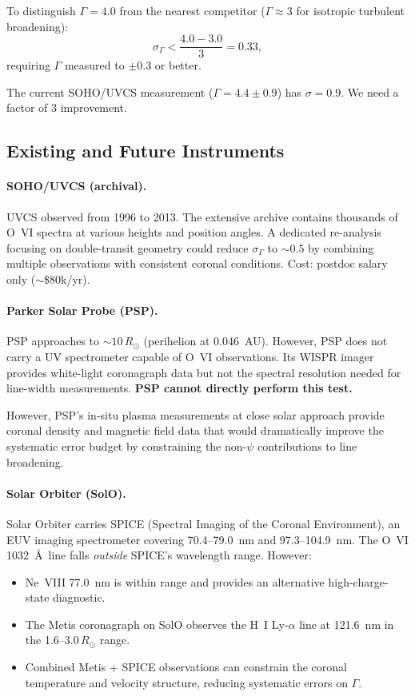 \documentclass[11pt]{article}
\newcommand{\Rsun}{R_\odot}
\begin{document}
To distinguish $\Gamma = 4.0$ from the nearest competitor
($\Gamma \approx 3$ for isotropic turbulent broadening):
\begin{equation}
\sigma_\Gamma < \frac{4.0 - 3.0}{3} = 0.33,
\end{equation}
requiring $\Gamma$ measured to $\pm 0.3$ or better.

The current SOHO/UVCS measurement ($\Gamma = 4.4 \pm 0.9$) has
$\sigma = 0.9$.  We need a factor of 3 improvement.

\subsection{Existing and Future Instruments}

\paragraph{SOHO/UVCS (archival).}
UVCS observed from 1996 to 2013.  The extensive archive contains
thousands of O~VI spectra at various heights and position angles.
A dedicated re-analysis focusing on double-transit geometry could
reduce $\sigma_\Gamma$ to $\sim 0.5$ by combining multiple
observations with consistent coronal conditions.  Cost: postdoc
salary only ($\sim$\$80k/yr).

\paragraph{Parker Solar Probe (PSP).}
PSP approaches to $\sim 10\,\Rsun$ (perihelion at $0.046$~AU).
However, PSP does not carry a UV spectrometer capable of O~VI
observations.  Its WISPR imager provides white-light coronagraph
data but not the spectral resolution needed for line-width
measurements.  \textbf{PSP cannot directly perform this test.}

However, PSP's in-situ plasma measurements at close solar approach
provide coronal density and magnetic field data that would
dramatically improve the systematic error budget by constraining
the non-$\psi$ contributions to line broadening.

\paragraph{Solar Orbiter (SolO).}
Solar Orbiter carries SPICE (Spectral Imaging of the Coronal
Environment), an EUV imaging spectrometer covering 70.4--79.0~nm
and 97.3--104.9~nm.  The O~VI 1032~\AA\ line falls \textit{outside}
SPICE's wavelength range.  However:
\begin{itemize}[nosep]
\item Ne~VIII 77.0~nm is within range and provides an alternative
high-charge-state diagnostic.
\item The Metis coronagraph on SolO observes the H~I Ly-$\alpha$
line at 121.6~nm in the 1.6--$3.0\,\Rsun$ range.
\item Combined Metis + SPICE observations can constrain the coronal
temperature and velocity structure, reducing systematic errors on
$\Gamma$.
\end{itemize}
\end{document}
